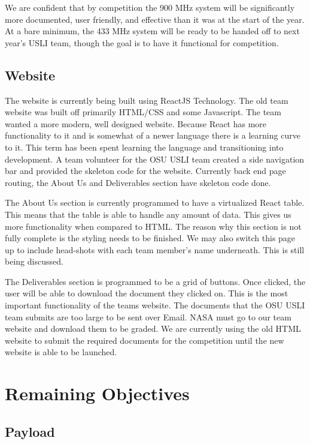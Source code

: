 \documentclass[journal,10pt,draftclsnofoot,onecolumn,compsoc]{IEEEtran} \usepackage[margin=0.75in]{geometry}
\begin{document}
\noindent We are confident that by competition the 900 MHz system will be significantly more documented, user friendly, and effective than it was at the start of the year. At a bare minimum, the 433 MHz system will be ready to be handed off to next year's USLI team, though the goal is to have it functional for competition.

\subsection{Website}
The website is currently being built using ReactJS Technology. The old team website was built off primarily HTML/CSS and some Javascript. The team wanted a more modern, well designed website. Because React has more functionality to it and is somewhat of a newer language there is a learning curve to it. This term has been spent learning the language and transitioning into development. A team volunteer for the OSU USLI team created a side navigation bar and provided the skeleton code for the website. Currently back end page routing, the About Us and Deliverables section have skeleton code done. \newline

\noindent The About Us section is currently programmed to have a virtualized React table. This means that the table is able to handle any amount of data. This gives us more functionality when compared to HTML. The reason why this section is not fully complete is the styling needs to be finished. We may also switch this page up to include head-shots with each team member's name underneath. This is still being discussed. \newline

\noindent The Deliverables section is programmed to be a grid of buttons. Once clicked, the user will be able to download the document they clicked on. This is the most important functionality of the teams website. The documents that the OSU USLI team submits are too large to be sent over Email. NASA must go to our team website and download them to be graded. We are currently using the old HTML website to submit the required documents for the competition until the new website is able to be launched. 


\section{Remaining Objectives}
\subsection{Payload}
\end{document}
